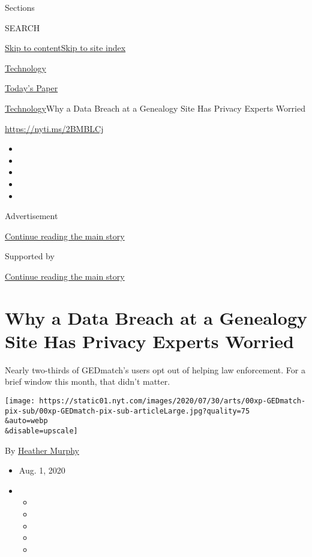 Sections

SEARCH

\protect\hyperlink{site-content}{Skip to
content}\protect\hyperlink{site-index}{Skip to site index}

\href{https://www.nytimes.com/section/technology}{Technology}

\href{https://myaccount.nytimes.com/auth/login?response_type=cookie\&client_id=vi}{}

\href{https://www.nytimes.com/section/todayspaper}{Today's Paper}

\href{/section/technology}{Technology}\textbar{}Why a Data Breach at a
Genealogy Site Has Privacy Experts Worried

\url{https://nyti.ms/2BMBLCj}

\begin{itemize}
\item
\item
\item
\item
\item
\end{itemize}

Advertisement

\protect\hyperlink{after-top}{Continue reading the main story}

Supported by

\protect\hyperlink{after-sponsor}{Continue reading the main story}

\hypertarget{why-a-data-breach-at-a-genealogy-site-has-privacy-experts-worried}{%
\section{Why a Data Breach at a Genealogy Site Has Privacy Experts
Worried}\label{why-a-data-breach-at-a-genealogy-site-has-privacy-experts-worried}}

Nearly two-thirds of GEDmatch's users opt out of helping law
enforcement. For a brief window this month, that didn't matter.

\texttt{[image: https://static01.nyt.com/images/2020/07/30/arts/00xp-GEDmatch-pix-sub/00xp-GEDmatch-pix-sub-articleLarge.jpg?quality=75\\\&auto=webp\\\&disable=upscale]}

By \href{https://www.nytimes.com/by/heather-murphy}{Heather Murphy}

\begin{itemize}
\item
  Aug. 1, 2020
\item
  \begin{itemize}
  \item
  \item
  \item
  \item
  \item
  \end{itemize}
\end{itemize}

